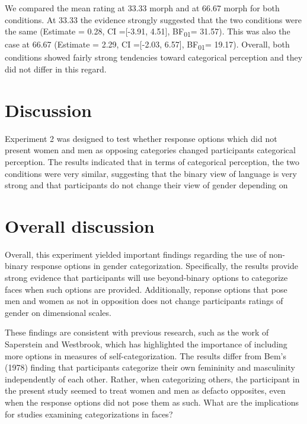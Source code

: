 \documentclass[
  man]{apa7}
\begin{document}
We compared the mean rating at 33.33 morph and at 66.67 morph for both conditions. At 33.33 the evidence strongly suggested that the two conditions were the same
(Estimate = 0.28, CI ={[}-3.91, 4.51{]}, BF\textsubscript{01}= 31.57). This was also the case at 66.67
(Estimate = 2.29, CI ={[}-2.03, 6.57{]}, BF\textsubscript{01}= 19.17). Overall, both conditions showed fairly strong tendencies toward categorical perception and they did not differ in this regard.

\hypertarget{discussion-1}{%
\section{Discussion}\label{discussion-1}}

Experiment 2 was designed to test whether response options which did not present women and men as opposing categories changed participants categorical perception. The results indicated that in terms of categorical perception, the two conditions were very similar, suggesting that the binary view of language is very strong and that participants do not change their view of gender depending on

\hypertarget{overall-discussion}{%
\section{Overall discussion}\label{overall-discussion}}

Overall, this experiment yielded important findings regarding the use of non-binary response options in gender categorization. Specifically, the results provide strong evidence that participants will use beyond-binary options to categorize faces when such options are provided. Additionally, reponse options that pose men and women as not in opposition does not change participants ratings of gender on dimensional scales.

These findings are consistent with previous research, such as the work of Saperstein and Westbrook, which has highlighted the importance of including more options in measures of self-categorization. The results differ from Bem's (1978) finding that participants categorize their own femininity and masculinity independently of each other. Rather, when categorizing others, the participant in the present study seemed to treat women and men as defacto opposites, even when the response options did not pose them as such. What are the implications for studies examining categorizations in faces?
\end{document}
